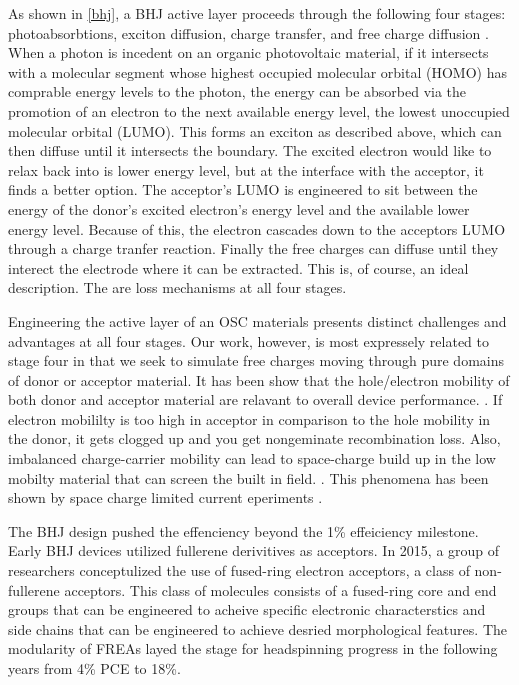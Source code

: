 As shown in \ref{bhj}, a BHJ active layer proceeds through the following four stages: photoabsorbtions, 
exciton diffusion, charge transfer, and free charge diffusion \citet{Fusella2019}. When a photon is incedent on
an organic photovoltaic material, if it intersects with a molecular segment whose 
highest occupied molecular orbital (HOMO) has comprable energy levels to the photon, the energy can be absorbed via the promotion of
an electron to the next available energy level, the lowest unoccupied molecular orbital (LUMO).
This forms an exciton as
described above, which can then diffuse until it intersects the boundary. 
The excited electron would like to relax
back into is lower energy level, but at the interface with the acceptor, it finds a better option. The
acceptor's LUMO is engineered to sit between the energy of the donor's excited electron's energy level and the
available lower energy level. Because of this, the electron cascades down to the acceptors LUMO through a charge
tranfer reaction. Finally the free charges can diffuse until they interect the electrode where it can be
extracted. This is, of course, an ideal description. The are loss mechanisms at all four stages. 

Engineering the active layer of an OSC materials presents distinct challenges and advantages at
all four stages. Our work, however,  is most expressely related to stage four in that we seek to simulate free charges moving
through pure domains of donor or acceptor material. 
It has been show that the hole/electron mobility of both donor and acceptor material are
relavant to overall device performance. \cite{Wang2019e}. If electron mobililty is too high
in acceptor  in comparison to the hole mobility in the donor, it gets clogged up and you get 
nongeminate recombination loss.
Also, imbalanced charge-carrier mobility can lead to space-charge build up in the low mobilty material that
can screen the built in field.  \cite{Bartelt2015}. 
This phenomena has been shown by space charge limited current eperiments \cite{Small2013}.

The BHJ design pushed the effenciency beyond the 1\% effeiciency milestone. Early BHJ devices utilized
fullerene derivitives as acceptors. In 2015, a group of researchers conceptulized the use of
fused-ring electron acceptors, a class of non-fullerene acceptors. This class of molecules consists of
a fused-ring core and end groups that can be engineered to acheive specific electronic characterstics and side
chains that can be engineered to achieve desried morphological features. The modularity of FREAs
layed the stage for headspinning progress in the following years from 4\% PCE to 18\%.
\cite{Wang2021a}

